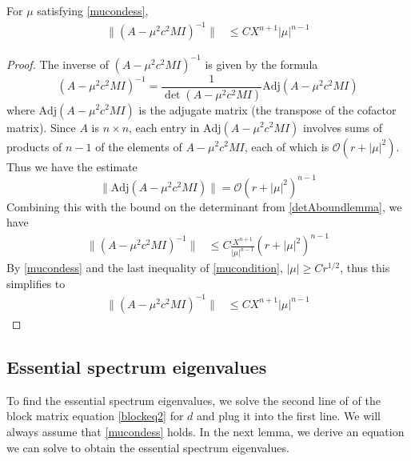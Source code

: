 \documentclass[thesis.tex]{subfiles}
\begin{document}
\begin{lemma}\label{Ainvboundlemma}
For $\mu$ satisfying \cref{mucondess},
\begin{align}\label{Ainvbound1}
\|(A - \mu^2 c^2 M I)^{-1}\| &\leq C X^{n+1} |\mu|^{n-1}
\end{align}
\begin{proof}
The inverse of $(A - \mu^2 c^2 M I)^{-1}$ is given by the formula
\[
(A - \mu^2 c^2 M I)^{-1} = \frac{1}{\det(A - \mu^2 c^2 M I)}\text{Adj}(A - \mu^2 c^2 M I)
\]
where $\text{Adj}(A - \mu^2 c^2 M I)$ is the adjugate matrix (the transpose of the cofactor matrix). Since $A$ is $n \times n$, each entry in $\text{Adj}(A - \mu^2 c^2 M I)$ involves sums of products of $n-1$ of the elements of $A - \mu^2 c^2 M I$, each of which is $\mathcal{O}(r + |\mu|^2)$. Thus we have the estimate
\[
\| \text{Adj}(A - \mu^2 c^2 M I)\| = \mathcal{O}(r + |\mu|^2)^{n-1}
\]
Combining this with the bound on the determinant from \cref{detAboundlemma}, we have
\begin{align*}
\|(A - \mu^2 c^2 M I)^{-1}\| &\leq C \frac{X^{n+1}}{|\mu|^{n-1}} (r + |\mu|^2)^{n-1}
\end{align*}
By \cref{mucondess} and the last inequality of \cref{mucondition}, $|\mu| \geq C r^{1/2}$, thus this simplifies to
\begin{align*}
\|(A - \mu^2 c^2 M I)^{-1}\| &\leq C X^{n+1} |\mu|^{n-1}
\end{align*}
\end{proof}
\end{lemma}

\subsection{Essential spectrum eigenvalues}

To find the essential spectrum eigenvalues, we solve the second line of of the block matrix equation \eqref{blockeq2} for $d$ and plug it into the first line. We will always assume that \cref{mucondess} holds. In the next lemma, we derive an equation we can solve to obtain the essential spectrum eigenvalues.
\end{document}
